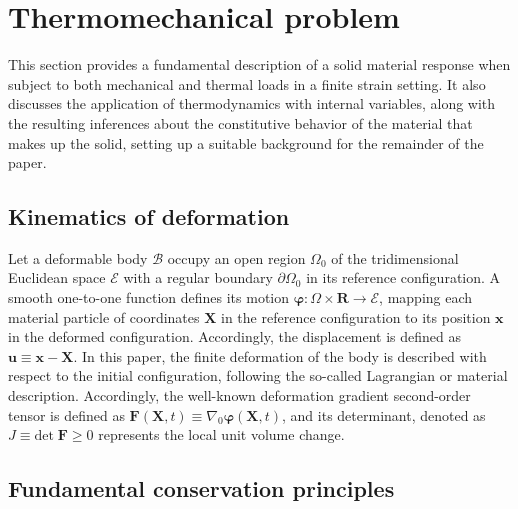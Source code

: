 \chapter{Thermomechanical problem} \label{sec:thermomechanical_problem}

This section provides a fundamental description of a solid material response when subject to both mechanical and thermal loads in a finite strain setting.
It also discusses the application of thermodynamics with internal variables, along with the resulting inferences about the constitutive behavior of the material that makes up the solid, setting up a suitable background for the remainder of the paper.

\section{Kinematics of deformation}

Let a deformable body $\mathscr{B}$ occupy an open region $\Omega_0$ of the tridimensional Euclidean space $\mathscr{E}$ with a regular boundary $\partial \Omega_0$ in its reference configuration.
A smooth one-to-one function defines its motion \(\bm{\varphi}\colon \Omega\times \mathbf{R}\to \mathscr{E}\), mapping each material particle of coordinates $\bm{X}$ in the reference configuration to its position $\bm{x}$ in the deformed configuration.
Accordingly, the displacement is defined as \(\bm{u}\equiv \bm{x} - \bm{X}\).
In this paper, the finite deformation of the body is described with respect to the initial configuration, following the so-called Lagrangian or material description.
Accordingly, the well-known deformation gradient second-order tensor is defined as \(\bm{F}(\bm{X},t)\equiv \nabla_0\bm\varphi(\bm{X},t)\), and its determinant, denoted as \(J\equiv \text{det}\;\bm{F} \geq 0\) represents the local unit volume change.

\section{Fundamental conservation principles} \label{sec:fundamental_conservation_princ}

